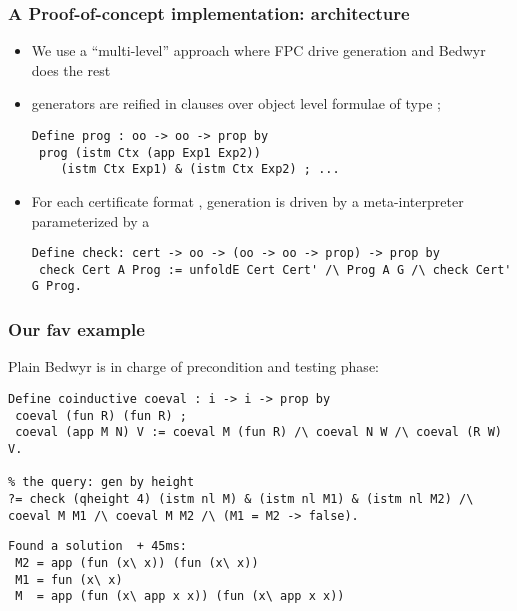 \documentclass{beamer}
\begin{document}
\begin{frame}[fragile]
  \frametitle{A Proof-of-concept implementation: architecture}
  \begin{itemize}
  \item We use a ``multi-level'' approach where FPC drive generation and Bedwyr does the rest
  \pause
    \item generators are reified in  clauses over object
      level formulae of type ;
      \begin{small}
\begin{lstlisting}
Define prog : oo -> oo -> prop by
 prog (istm Ctx (app Exp1 Exp2))
    (istm Ctx Exp1) & (istm Ctx Exp2) ; ...
\end{lstlisting}
      \end{small}
      \pause
  \item For each certificate format ,
    generation is driven by a meta-interpreter 
    parameterized by a 
    \begin{small}
\begin{lstlisting}
Define check: cert -> oo -> (oo -> oo -> prop) -> prop by
 check Cert A Prog := unfoldE Cert Cert' /\ Prog A G /\ check Cert' G Prog.
\end{lstlisting}
  \end{small}




  \end{itemize}
\end{frame}


\begin{frame}[fragile]
  \frametitle{Our fav example}
  Plain Bedwyr is in charge of precondition and testing phase:
      \begin{small}
\begin{lstlisting}
Define coinductive coeval : i -> i -> prop by
 coeval (fun R) (fun R) ;
 coeval (app M N) V := coeval M (fun R) /\ coeval N W /\ coeval (R W) V.

% the query: gen by height
?= check (qheight 4) (istm nl M) & (istm nl M1) & (istm nl M2) /\ coeval M M1 /\ coeval M M2 /\ (M1 = M2 -> false).
\end{lstlisting}
      \end{small}
      \pause
      \begin{small}
\begin{lstlisting}
Found a solution  + 45ms:
 M2 = app (fun (x\ x)) (fun (x\ x))
 M1 = fun (x\ x)
 M  = app (fun (x\ app x x)) (fun (x\ app x x))
\end{lstlisting}
      \end{small}
\end{frame}
\end{document}
